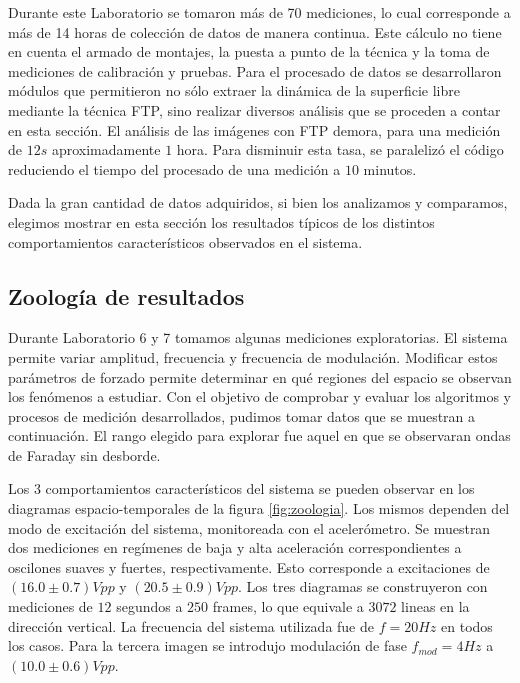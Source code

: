 \documentclass[../main.tex]{subfiles}
\begin{document}
Durante este Laboratorio se tomaron más de 70 mediciones, lo cual corresponde a más de 14 horas de colección de datos de manera continua. Este cálculo no tiene en cuenta el armado de montajes, la puesta a punto de la técnica y la toma de mediciones de calibración y pruebas. Para el procesado de datos se desarrollaron módulos que permitieron no sólo extraer la dinámica de la superficie libre mediante la técnica FTP, sino realizar diversos análisis que se proceden a contar en esta sección. El análisis de las imágenes con FTP demora, para una medición de $12 \si{s}$ aproximadamente $1$ hora. Para disminuir esta tasa, se paralelizó el código reduciendo el tiempo del procesado de una medición a $10$ minutos. 

Dada la gran cantidad de datos adquiridos, si bien los analizamos y comparamos, elegimos mostrar en esta sección los resultados típicos de los distintos comportamientos característicos observados en el sistema. 

\subsection{Zoología de resultados}
Durante Laboratorio 6 y 7 tomamos algunas mediciones exploratorias. El sistema permite variar amplitud, frecuencia y frecuencia de modulación. Modificar estos parámetros de forzado permite determinar en qué regiones del espacio se observan los fenómenos a estudiar. 
Con el objetivo de comprobar y evaluar los algoritmos y procesos de medición desarrollados, pudimos tomar datos que se muestran a continuación. El rango elegido para explorar fue aquel en que se observaran ondas de Faraday sin desborde. 

Los 3 comportamientos característicos del sistema se pueden observar en los diagramas espacio-temporales de la figura \ref{fig:zoologia}. Los mismos dependen del modo de excitación del sistema, monitoreada con el acelerómetro. Se muestran dos mediciones en regímenes de baja y alta aceleración correspondientes a oscilones suaves y fuertes, respectivamente. Esto corresponde a excitaciones de $(16.0 \pm 0.7) \si{Vpp}$ y $(20.5\pm0.9)\si{Vpp}$. Los tres diagramas se construyeron con mediciones de $12$ segundos a $250$ frames, lo que equivale a $3072$ lineas en la dirección vertical. La frecuencia del sistema utilizada fue de $f = 20 \si{Hz}$ en todos los casos. Para la tercera imagen se introdujo modulación de fase $f_{mod} = 4 \si{Hz}$ a $(10.0 \pm 0.6) \si{Vpp}$.
\end{document}
